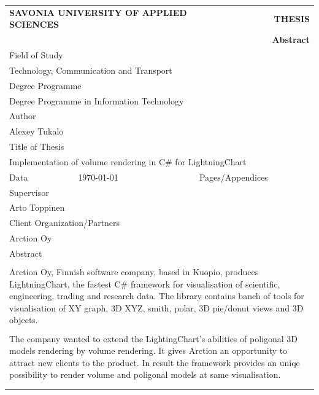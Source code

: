 \documentclass[english]{article}
\begin{document}
\begin{table}[htbp]
\begin{tabular}{| l | l | l | l |}
\multicolumn{2}{l}{\textbf{SAVONIA UNIVERSITY OF APPLIED SCIENCES}}&
\multicolumn{2}{r}{\textbf{THESIS}}\\
\multicolumn{4}{r}{\textbf{Abstract}}\\
\hline
\multicolumn{4}{|l|}{Field of Study}\\
\multicolumn{4}{|l|}{Technology, Communication and Transport}\\
\hline
\multicolumn{4}{|l|}{Degree Programme}\\
\multicolumn{4}{|l|}{Degree Programme in Information Technology}\\
\hline
\multicolumn{4}{|l|}{Author}\\
\multicolumn{4}{|l|}{Alexey Tukalo}\\
\hline
\multicolumn{4}{|l|}{Title of Thesis}\\
\multicolumn{4}{|l|}{Implementation of volume rendering in C\# for LightningChart}\\
\hline
Data & \today & Pages/Appendices & \pageref{LastPage}\\
\hline
\multicolumn{4}{|l|}{Supervisor}\\
\multicolumn{4}{|l|}{Arto Toppinen}\\
\hline
\multicolumn{4}{|l|}{Client Organization/Partners}\\
\multicolumn{4}{|l|}{Arction Oy}\\
\hline
\multicolumn{4}{|l|}{Abstract}\\
\multicolumn{4}{|l|}{ }\\
\multicolumn{4}{|p{14cm}|}{
Arction Oy, Finnish software company, based in Kuopio, produces LightningChart, the fastest C\# framework for visualisation of scientific, engineering, trading and research data. The library contains banch of tools for visualisation of XY graph, 3D XYZ, smith, polar, 3D pie/donut views and 3D objects.
}\\
\multicolumn{4}{|l|}{ }\\
\multicolumn{4}{|p{14cm}|}{
The company wanted to extend the LightingChart's abilities of poligonal 3D models rendering by volume rendering. It gives Arction an opportunity to attract new clients to the product. In result the framework provides an uniqe possibility to  render volume and poligonal models at same visualisation.
}\\
\multicolumn{4}{|l|}{ }\\
\multicolumn{4}{|p{14cm}|}{
}
\end{tabular}
\end{table}
\end{document}
